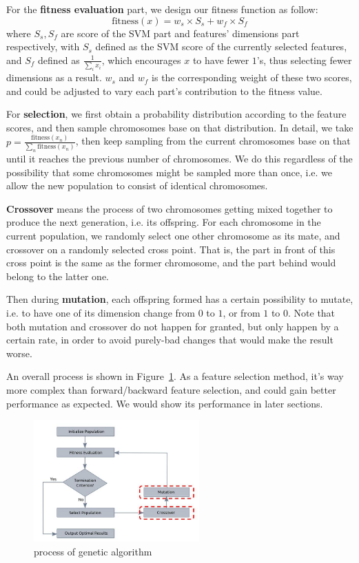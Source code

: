 \documentclass[journal]{IEEEtran}
\begin{document}
For the \textbf{fitness evaluation} part, we design our fitness function as follow:
$$
\mathrm{fitness}(x) = w_s\times S_s + w_f\times S_f
$$
where $S_s, S_f$ are score of the SVM part and features' dimensions part respectively, with $S_s$ defined as the SVM score of the currently selected features, and $S_f$ defined as $\frac{1}{\sum_i x_i}$, which encourages $x$ to have fewer $1$'s, thus selecting fewer dimensions as a result. $w_s$ and $w_f$ is the corresponding weight of these two scores, and could be adjusted to vary each part's contribution to the fitness value.

For \textbf{selection}, we first obtain a probability distribution according to the feature scores, and then sample chromosomes base on that distribution. In detail, we take $p = \frac{\mathrm{fitness}(x_n)}{\sum_n \mathrm{fitness}(x_n)}$, then keep sampling from the current chromosomes base on that until it reaches the previous number of chromosomes. We do this regardless of the possibility that some chromosomes might be sampled more than once, i.e. we allow the new population to consist of identical chromosomes.

\textbf{Crossover} means the process of two chromosomes getting mixed together to produce the next generation, i.e. its offspring. For each chromosome in the current population, we randomly select one other chromosome as its mate, and crossover on a randomly selected cross point. That is, the part in front of this cross point is the same as the former chromosome, and the part behind would belong to the latter one.

Then during \textbf{mutation}, each offspring formed has a certain possibility to mutate, i.e. to have one of its dimension change from $0$ to $1$, or from $1$ to $0$. Note that both mutation and crossover do not happen for granted, but only happen by a certain rate, in order to avoid purely-bad changes that would make the result worse.

An overall process is shown in Figure~\ref{fig:1}. As a feature selection method, it's way more complex than forward/backward feature selection, and could gain better performance as expected. We would show its performance in later sections. 
\begin{figure}[htpb]
  \centering
  \includegraphics[width=2.5in]{genetic_alg.jpg}
  \caption{process of genetic algorithm}
  \label{fig:1}
  \vspace{-3mm}
\end{figure}
\end{document}
